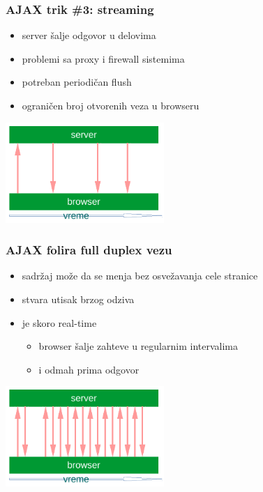 \documentclass[compress]{beamer}
\begin{document}
\begin{frame}
  \frametitle{AJAX trik \#3: streaming }
  \begin{itemize}
    \item server šalje odgovor u delovima
    \item problemi sa proxy i firewall sistemima
    \item potreban periodičan flush
    \item ograničen broj otvorenih veza u browseru
  \end{itemize}
  \begin{center}
    \includegraphics[width=6cm]{streaming.pdf}
  \end{center}
\end{frame}

\begin{frame}
  \frametitle{AJAX folira full duplex vezu}
  \begin{itemize}
    \item sadržaj može da se menja bez osvežavanja cele stranice
    \item stvara utisak brzog odziva
    \item {} je skoro real-time
    \begin{itemize}
      \item browser šalje zahteve u regularnim intervalima
      \item i odmah prima odgovor
    \end{itemize}  
  \end{itemize}
  \begin{center}
    \includegraphics[width=6cm]{polling.pdf}
  \end{center}
\end{frame}
\end{document}
